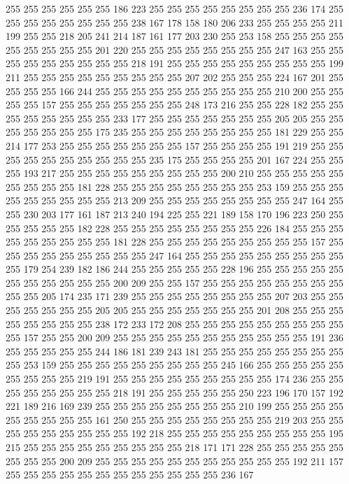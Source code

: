 255 255 255 255 255 255 186 223 255 255 255 255 255 255 255 255 236 174 255 255
255 255 255 255 255 255 238 167 178 158 180 206 233 255 255 255 255 211 199 255
255 218 205 241 214 187 161 177 203 230 255 253 158 255 255 255 255 255 255 255
255 255 201 220 255 255 255 255 255 255 255 255 247 163 255 255 255 255 255 255
255 255 255 218 191 255 255 255 255 255 255 255 255 255 199 211 255 255 255 255
255 255 255 255 255 207 202 255 255 255 224 167 201 255 255 255 255 166 244 255
255 255 255 255 255 255 255 255 255 210 200 255 255 255 255 157 255 255 255 255
255 255 255 248 173 216 255 255 228 182 255 255 255 255 255 255 255 255 233 177
255 255 255 255 255 255 255 205 205 255 255 255 255 255 255 255 175 235 255 255
255 255 255 255 255 255 181 229 255 255 214 177 253 255 255 255 255 255 255 255
157 255 255 255 255 191 219 255 255 255 255 255 255 255 255 255 255 235 175 255
255 255 255 201 167 224 255 255 255 193 217 255 255 255 255 255 255 255 255 255
200 210 255 255 255 255 255 255 255 255 255 181 228 255 255 255 255 255 255 255
255 253 159 255 255 255 255 255 255 255 255 255 213 209 255 255 255 255 255 255
255 255 247 164 255 255 230 203 177 161 187 213 240 194 225 255 221 189 158 170
196 223 250 255 255 255 255 255 182 228 255 255 255 255 255 255 255 255 226 184
255 255 255 255 255 255 255 255 255 181 228 255 255 255 255 255 255 255 255 255
157 255 255 255 255 255 255 255 255 255 247 164 255 255 255 255 255 255 255 255
255 255 179 254 239 182 186 244 255 255 255 255 255 228 196 255 255 255 255 255
255 255 255 255 255 255 200 209 255 255 157 255 255 255 255 255 255 255 255 255
255 205 174 235 171 239 255 255 255 255 255 255 255 255 207 203 255 255 255 255
255 255 255 205 205 255 255 255 255 255 255 255 201 208 255 255 255 255 255 255
255 255 238 172 233 172 208 255 255 255 255 255 255 255 255 255 255 157 255 255
200 209 255 255 255 255 255 255 255 255 255 255 255 191 236 255 255 255 255 255
244 186 181 239 243 181 255 255 255 255 255 255 255 255 255 253 159 255 255 255
255 255 255 255 255 255 245 166 255 255 255 255 255 255 255 255 255 219 191 255
255 255 255 255 255 255 255 255 174 236 255 255 255 255 255 255 255 255 218 191
255 255 255 255 255 250 223 196 170 157 192 221 189 216 169 239 255 255 255 255
255 255 255 255 210 199 255 255 255 255 255 255 255 255 255 161 250 255 255 255
255 255 255 255 255 219 203 255 255 255 255 255 255 255 255 255 192 218 255 255
255 255 255 255 255 255 255 195 215 255 255 255 255 255 255 255 255 255 218 171
171 228 255 255 255 255 255 255 255 255 200 209 255 255 255 255 255 255 255 255
255 255 255 192 211 157 255 255 255 255 255 255 255 255 255 255 255 255 236 167
